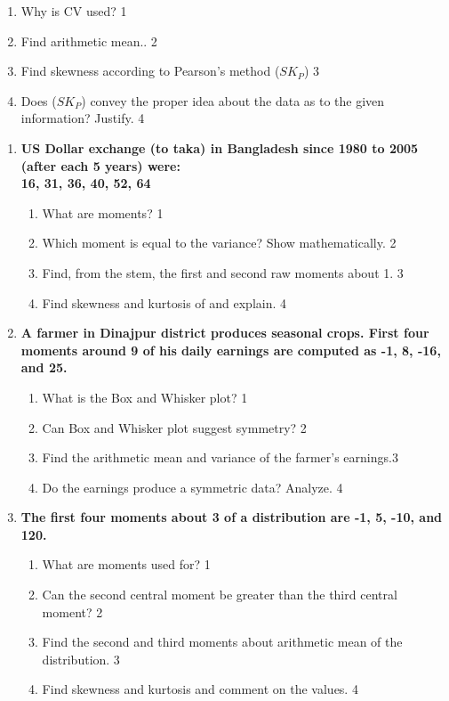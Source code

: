 \documentclass[a4paper,oneside]{book}
\begin{document}
\begin{enumerate}
  \begin{enumerate}
    \item
	Why is  CV used?  \hfill 1
    \item
	Find arithmetic mean.. \hfill 2
    \item  
	Find skewness according to Pearson's method ($SK_P$) \hfill 3
    \item
	Does ($SK_P$) convey the proper idea about the data as to the given information? Justify. \hfill 4
  \end{enumerate}
  \end{enumerate}

  \begin{enumerate}
 \item
	  \textbf{US Dollar exchange (to taka) in Bangladesh since 1980 to 2005 (after each 5 years) were: \\ 16, 31, 36, 40, 52, 64} 
  
  \begin{enumerate}
    \item
	What are moments? \hfill 1
    \item
	Which moment is equal to the variance? Show mathematically. \hfill 2
    \item  
	Find, from the stem, the first and second raw moments about 1. \hfill 3
    \item
	Find skewness and kurtosis of and explain. \hfill 4
\end{enumerate}

 \item
	  \textbf{A farmer in Dinajpur district produces seasonal crops. First four moments around 9 of his daily earnings are computed as -1, 8, -16, and 25.}
  
  \begin{enumerate}
    \item
	What is the Box and Whisker plot? \hfill 1
    \item
	Can Box and Whisker plot suggest symmetry? \hfill 2
    \item  
	 Find the arithmetic mean and variance of the farmer's earnings.\hfill 3
    \item
	Do the earnings produce a symmetric data? Analyze. \hfill 4
  \end{enumerate}

 \item
	  \textbf{The first four moments about 3 of a distribution are -1, 5, -10, and 120.} 
  
  \begin{enumerate}
    \item
	What are moments used for? \hfill 1
    \item
	Can the second central moment be greater than the third central moment? \hfill 2
    \item  
	Find the second and third moments about arithmetic mean of the distribution. \hfill 3
    \item
	Find skewness and kurtosis and comment on the values.  \hfill 4
\end{enumerate}


\end{enumerate}
\end{document}
